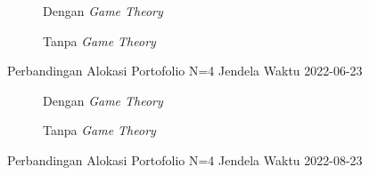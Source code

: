 \begin{figure}[!htbp]
    \centering
    \begin{subfigure}[b]{0.48\textwidth}
        \centering
        


        \caption{Dengan \textit{Game Theory}}
    \end{subfigure}
    \hfill
    \begin{subfigure}[b]{0.48\textwidth}
        \centering
        


        \caption{Tanpa \textit{Game Theory}}
    \end{subfigure}
    \caption{Perbandingan Alokasi Portofolio N=4 Jendela Waktu 2022-06-23}
    \label{fig:window_n4_2022_06_23}
\end{figure}

%         
% 
% 
%         
% 
% 

\begin{figure}[!htbp]
    \centering
    \begin{subfigure}[b]{0.48\textwidth}
        \centering
        


        \caption{Dengan \textit{Game Theory}}
    \end{subfigure}
    \hfill
    \begin{subfigure}[b]{0.48\textwidth}
        \centering
        


        \caption{Tanpa \textit{Game Theory}}
    \end{subfigure}
    \caption{Perbandingan Alokasi Portofolio N=4 Jendela Waktu 2022-08-23}
    \label{fig:window_n4_2022_08_23}
\end{figure}

